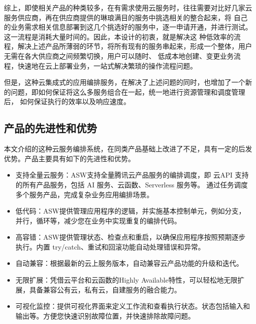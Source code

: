 %
%
%
%
%


综上，即使相关产品的种类较多，在有需求使用云服务时，往往需要对比好几家云服务供应商，再在供应商提供的琳琅满目的服务中挑选相关的整合起来，将
自己的业务需求相关信息部署到这几个挑选好的服务中，逐一申请开通，并进行测试。这一流程是消耗大量时间的。因此，本设计的初衷，就是解决这
种低效率的流程，解决上述产品所薄弱的环节，将所有现有的服务串起来，形成一个整体，用户无需在各大供应商之间频繁切换，用户可以随时、
低成本地创建、变更业务流程，快速地在云上部署业务，一站式解决繁琐的操作流程问题\cite{jydyyybp}。

但是，这种云集成式的应用编排服务，在解决了上述问题的同时，也增加了一个新的问题，即如何保证将这么多服务组合在一起，统一地进行资源管理和调度管理后，
如何保证执行的效率以及响应速度。

\subsection{产品的先进性和优势}
本文介绍的这种云服务编排系统，在同类产品基础上改进了不足，具有一定的后发优势。产品主要具有如下的先进性和优势。

\begin{itemize}
    \item 支持全量云服务：ASW支持全量腾讯云产品服务的编排调度，即 云API 支持的所有产品服务，包括 AI 服务、云函数、Serverless 服务等。
    通过任务调度多个服务产品，完成复杂业务应用编排场景。
    \item 低代码：ASW提供管理应用程序的逻辑，并实施基本控制单元，例如分支，并行，循环等，减少您在业务中实现重复的编排代码。
    \item 高容错：ASW提供管理状态、检查点和重启，以确保应用程序按照预期逐步执行。内置 try/catch、重试和回滚功能自动处理错误和异常。
    \item 自动兼容：根据最新的云上服务版本，自动兼容云产品功能的升级和迭代。
    \item 无限扩展：凭借云平台和云函数的Highly Available特性，可以轻松地无限扩展，具备兼容公有云，私有云，自建服务的融合能力。
    \item 可视化监控：提供可视化界面来定义工作流和查看执行状态。状态包括输入和输出等。方便您快速识别故障位置，并快速排除故障问题。
\end{itemize}



